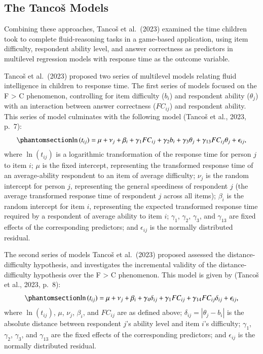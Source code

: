 \documentclass[
  number]{elsarticle}
\begin{document}
\subsection{The Tancoš Models}\label{the-tancoux161-models}

Combining these approaches, Tancoš et al.~(2023) examined the time
children took to complete fluid-reasoning tasks in a game-based
application, using item difficulty, respondent ability level, and answer
correctness as predictors in multilevel regression models with response
time as the outcome variable.

Tancoš et al.~(2023) proposed two series of multilevel models relating
fluid intelligence in children to response time. The first series of
models focused on the F \textgreater{} C phenomenon, controlling for
item difficulty (\(b_i\)) and respondent ability (\(\theta_j\)) with an
interaction between answer correctness (\(FC_{ij}\)) and respondent
ability. This series of model culminates with the following model
(Tancoš et al., 2023, p.~7):
\begin{equation}\phantomsection\label{eq-Tancos}{\ln{(t_{ij})} = \mu + \nu_j +\beta_i +\gamma_1FC_{ij}+\gamma_2b_i+\gamma_3\theta_j+\gamma_{13}FC_{ij}\theta_j+\epsilon_{ij},}\end{equation}
where \(\ln{(t_{ij})}\) is a logarithmic transformation of the response
time for person \(j\) to item \(i\); \(\mu\) is the fixed intercept,
representing the transformed response time of an average-ability
respondent to an item of average difficulty; \(\nu_j\) is the random
intercept for person \(j\), representing the general speediness of
respondent \(j\) (the average transformed response time of respondent
\(j\) across all items); \(\beta_i\) is the random intercept for item
\(i\), representing the expected transformed response time required by a
respondent of average ability to item \(i\); \(\gamma_1\), \(\gamma_2\),
\(\gamma_3\), and \(\gamma_{13}\) are fixed effects of the corresponding
predictors; and \(\epsilon_{ij}\) is the normally distributed residual.

The second series of models Tancoš et al.~(2023) proposed assessed the
distance-difficulty hypothesis, and investigates the incremental
validity of the distance-difficulty hypothesis over the F \textgreater{}
C phenomenon. This model is given by (Tancoš et al., 2023, p.~8):
\begin{equation}\phantomsection\label{eq-Tancos2}{\ln{(t_{ij})} = \mu + \nu_j +\beta_i +\gamma_4\delta_{ij}+\gamma_1FC_{ij}+\gamma_{14}FC_{ij}\delta_{ij}+\epsilon_{ij},}\end{equation}
where \(\ln{(t_{ij})}\), \(\mu\), \(\nu_j\), \(\beta_i\), and
\(FC_{ij}\) are as defined above; \(\delta_{ij}=|\theta_j-b_i|\) is the
absolute distance between respondent \(j\)'s ability level and item
\(i\)'s difficulty; \(\gamma_1\), \(\gamma_2\), \(\gamma_3\), and
\(\gamma_{13}\) are the fixed effects of the corresponding predictors;
and \(\epsilon_{ij}\) is the normally distributed residual.
\end{document}
